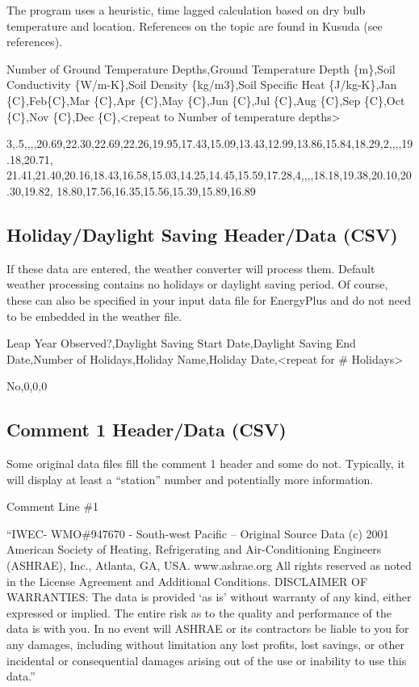 The program uses a heuristic, time lagged calculation based on dry bulb temperature and location. References on the topic are found in Kusuda (see references).

Number of Ground Temperature Depths,Ground Temperature Depth \{m\},Soil Conductivity \{W/m-K\},Soil Density \{kg/m3\},Soil Specific Heat \{J/kg-K\},Jan \{C\},Feb\{C\},Mar \{C\},Apr \{C\},May \{C\},Jun \{C\},Jul \{C\},Aug \{C\},Sep \{C\},Oct \{C\},Nov \{C\},Dec \{C\},\textless{}repeat to Number of temperature depths\textgreater{}

3,.5,,,,20.69,22.30,22.69,22.26,19.95,17.43,15.09,13.43,12.99,13.86,15.84,18.29,2,,,,19.18,20.71, 21.41,21.40,20.16,18.43,16.58,15.03,14.25,14.45,15.59,17.28,4,,,,18.18,19.38,20.10,20.30,19.82, 18.80,17.56,16.35,15.56,15.39,15.89,16.89

\subsection{Holiday/Daylight Saving Header/Data (CSV)}\label{holidaydaylight-saving-headerdata-csv}

If these data are entered, the weather converter will process them. Default weather processing contains no holidays or daylight saving period. Of course, these can also be specified in your input data file for EnergyPlus and do not need to be embedded in the weather file.

Leap Year Observed?,Daylight Saving Start Date,Daylight Saving End Date,Number of Holidays,Holiday Name,Holiday Date,\textless{}repeat for \# Holidays\textgreater{}

No,0,0,0

\subsection{Comment 1 Header/Data (CSV)}\label{comment-1-headerdata-csv}

Some original data files fill the comment 1 header and some do not. Typically, it will display at least a ``station'' number and potentially more information.

Comment Line \#1

``IWEC- WMO\#947670 - South-west Pacific -- Original Source Data (c) 2001 American Society of Heating, Refrigerating and Air-Conditioning Engineers (ASHRAE), Inc., Atlanta, GA, USA. www.ashrae.org All rights reserved as noted in the License Agreement and Additional Conditions. DISCLAIMER OF WARRANTIES: The data is provided `as is' without warranty of any kind, either expressed or implied. The entire risk as to the quality and performance of the data is with you. In no event will ASHRAE or its contractors be liable to you for any damages, including without limitation any lost profits, lost savings, or other incidental or consequential damages arising out of the use or inability to use this data.''

